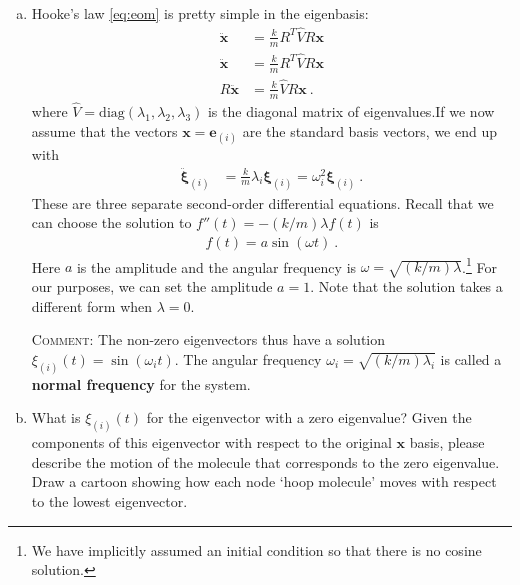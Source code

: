 \documentclass[12pt]{article}
\numberwithin{equation}{section}    %
\renewcommand{\vec}[1]{\mathbf{#1}} %
\begin{document}
\begin{enumerate}[(a)]
\item Hooke's law \eqref{eq:eom} is pretty simple in the eigenbasis:
\begin{align}
	\ddot{\vec{x}} &= \frac{k}{m} R^T \hat V R \vec{x} \\
	\ddot{\vec{x}} &= \frac{k}{m} R^T \hat V R \vec{x} \\
	R\ddot{\vec{x}} &= \frac{k}{m} \hat V R \vec{x}  \ .
\end{align}
where $\hat V=\text{diag}(\lambda_1, \lambda_2, \lambda_3)$ is the diagonal matrix of eigenvalues.If we now assume that the vectors $\vec{x} = \vec{e}_{(i)}$ are the standard basis vectors, we end up with 
\begin{align}
	\ddot{\vec{\xi}}_{(i)} &= \frac{k}{m} \lambda_i \vec{\xi}_{(i)} =\omega_i^2 \vec{\xi}_{(i)}  \ .
\end{align}
 These are three separate second-order differential equations. Recall that we can choose the solution to $f''(t) = -(k/m) \lambda f(t)$ is
\begin{align}
	f(t) = a \sin(\omega  t) \ .
\end{align}
Here $a$ is the amplitude and the angular frequency is $\omega = \sqrt{(k/m)\lambda}$.\footnote{We have implicitly assumed an initial condition so that there is no cosine solution.} For our purposes, we can set the amplitude $a=1$. Note that the solution takes a different form when $\lambda=0$. 

\textsc{Comment:} The non-zero eigenvectors thus have a solution $\xi_{(i)}(t) = \sin(\omega_i t)$. The angular frequency $\omega_i = \sqrt{(k/m)\lambda_i}$ is called a \textbf{normal frequency} for the system. 

\item What is $\xi_{(i)}(t)$ for the eigenvector with a zero eigenvalue? Given the components of this eigenvector with respect to the original $\vec{x}$ basis, please describe the motion of the molecule that corresponds to the zero eigenvalue. Draw a cartoon showing how each node `hoop molecule' moves with respect to the lowest eigenvector. 




\end{enumerate}
\end{document}
